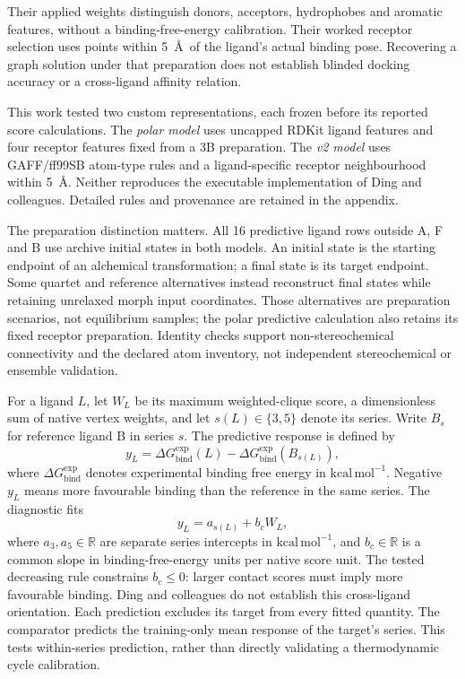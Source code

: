 \documentclass{article}
\begin{document}
Their applied weights distinguish donors, acceptors, hydrophobes and aromatic features, without a binding-free-energy calibration. Their worked receptor selection uses points within 5~\AA\ of the ligand's actual binding pose. Recovering a graph solution under that preparation does not establish blinded docking accuracy or a cross-ligand affinity relation.\cite{P}

This work tested two custom representations, each frozen before its reported score calculations. The \emph{polar model} uses uncapped RDKit ligand features and four receptor features fixed from a 3B preparation. The \emph{v2 model} uses GAFF/ff99SB atom-type rules and a ligand-specific receptor neighbourhood within 5~\AA. Neither reproduces the executable implementation of Ding and colleagues. Detailed rules and provenance are retained in the appendix.

The preparation distinction matters. All 16 predictive ligand rows outside A, F and B use archive initial states in both models. An initial state is the starting endpoint of an alchemical transformation; a final state is its target endpoint. Some quartet and reference alternatives instead reconstruct final states while retaining unrelaxed morph input coordinates. Those alternatives are preparation scenarios, not equilibrium samples; the polar predictive calculation also retains its fixed receptor preparation. Identity checks support non-stereochemical connectivity and the declared atom inventory, not independent stereochemical or ensemble validation.

For a ligand \(L\), let \(W_L\) be its maximum weighted-clique score, a dimensionless sum of native vertex weights, and let \(s(L)\in\{3,5\}\) denote its series. Write \(B_s\) for reference ligand B in series \(s\). The predictive response is defined by
\[
 y_L=\Delta G_{\mathrm{bind}}^{\mathrm{exp}}(L)
       -\Delta G_{\mathrm{bind}}^{\mathrm{exp}}(B_{s(L)}),
\]
where \(\Delta G_{\mathrm{bind}}^{\mathrm{exp}}\) denotes experimental binding free energy in \(\mathrm{kcal\,mol^{-1}}\). Negative \(y_L\) means more favourable binding than the reference in the same series. The diagnostic fits
\[
 y_L=a_{s(L)}+b_cW_L,
\]
where \(a_3,a_5\in\mathbb R\) are separate series intercepts in \(\mathrm{kcal\,mol^{-1}}\), and \(b_c\in\mathbb R\) is a common slope in binding-free-energy units per native score unit. The tested decreasing rule constrains \(b_c\leq0\): larger contact scores must imply more favourable binding. Ding and colleagues do not establish this cross-ligand orientation. Each prediction excludes its target from every fitted quantity. The comparator predicts the training-only mean response of the target's series. This tests within-series prediction, rather than directly validating a thermodynamic cycle calibration.
\end{document}
